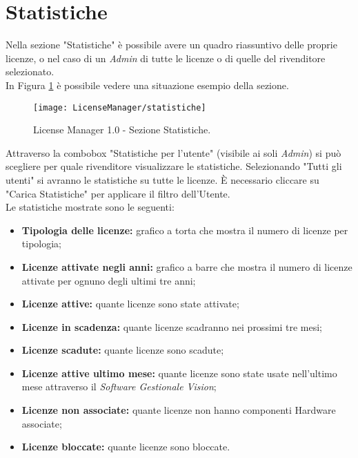 \section{Statistiche}

Nella sezione "Statistiche" è possibile avere un quadro riassuntivo delle proprie licenze, o nel caso di un \textit{Admin} di tutte le licenze o di quelle del rivenditore selezionato.\\
In Figura \ref{stat} è possibile vedere una situazione esempio della sezione.


\begin{figure}[!h] 
    \centering 
    \texttt{[image: LicenseManager/statistiche]} 
    \caption{License Manager 1.0 - Sezione Statistiche.}
\label{stat}

\end{figure}

Attraverso la combobox "Statistiche per l’utente" (visibile ai soli \textit{Admin}) si può scegliere per quale rivenditore visualizzare le statistiche. Selezionando "Tutti gli utenti" si avranno le statistiche su tutte le licenze. È necessario cliccare su "Carica Statistiche" per applicare il filtro dell’Utente.\\
Le statistiche mostrate sono le seguenti:

\begin{itemize}

\item \textbf{Tipologia delle licenze:} grafico a torta che mostra il numero di licenze per tipologia;
\item \textbf{Licenze attivate negli anni:} grafico a barre che mostra il numero di licenze attivate per ognuno degli ultimi tre anni;
\item \textbf{Licenze attive:} quante licenze sono state attivate;
\item \textbf{Licenze in scadenza:} quante licenze scadranno nei prossimi tre mesi;
\item \textbf{Licenze scadute:} quante licenze sono scadute;
\item \textbf{Licenze attive ultimo mese:} quante licenze sono state usate nell’ultimo mese attraverso il \textit{Software Gestionale Vision};
\item \textbf{Licenze non associate:} quante licenze non hanno componenti Hardware associate;
\item \textbf{Licenze bloccate:} quante licenze sono bloccate.

\end{itemize}

